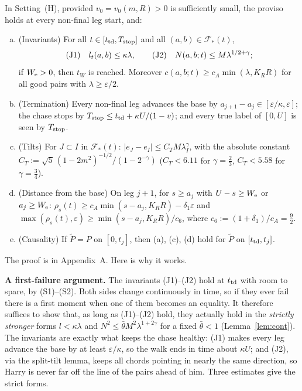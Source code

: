 \begin{theorem}\label{thm:end}
In Setting~\textup{(H)}, provided $v_0=v_0(m,R)>0$ is sufficiently small, the proviso holds at every non-final leg
start, and:
\begin{enumerate}[(a)]
\setlength{\itemsep}{1pt}\setlength{\parskip}{0pt}
\item \textup{(Invariants)} For all $t\in[t_{\mathrm{td}},T_{\mathrm{stop}}]$ and all $(a,b)\in\mathcal F_*(t)$,
\begin{equation}\label{eq:invariants}
\text{\textup{(J1)}}\quad l_t(a,b)\le\kappa\lambda,\qquad\text{\textup{(J2)}}\quad N(a,b;t)\le M\lambda^{1/2+\gamma};
\end{equation}
if $W_{\mathrm{e}}>0$, then $t_W$ is reached. Moreover $c(a,b;t)\ge c_A\min(\lambda,K_RR)$ for all good pairs with
$\lambda\ge\varepsilon/2$.
\item \textup{(Termination)} Every non-final leg advances the base by $a_{j+1}-a_j\in[\varepsilon/\kappa,\varepsilon]$;
the chase stops by $T_{\mathrm{stop}}\le t_{\mathrm{td}}+\kappa U/(1-v)$; and every true label of $[0,U]$ is seen by $T_{\mathrm{stop}}$.
\item \textup{(Tilts)} For $J\subset I$ in $\mathcal F_*(t)$: $|e_J-e_I|\le C_TM\lambda_I^\gamma$, with the absolute
constant $C_T:=\sqrt5\,(1-2m^2)^{-1/2}/(1-2^{-\gamma})$ \textup($C_T<6.11$ for $\gamma=\frac23$, $C_T<5.58$ for
$\gamma=\frac34$\textup).
\item \textup{(Distance from the base)} On leg $j+1$, for $s\ge a_j$ with $U-s\ge W_{\mathrm{e}}$ or $a_j\ge W_{\mathrm{e}}$:
$\rho_s(t)\ge c_A\min(s-a_j,K_RR)-\delta_1\varepsilon$ and $\max(\rho_s(t),\varepsilon)\ge\min(s-a_j,K_RR)/c_6$, where
$c_6:=(1+\delta_1)/c_A=\frac92$.
\item \textup{(Causality)} If $\tilde P=P$ on $[0,t_j]$, then \textup{(a)}, \textup{(c)}, \textup{(d)} hold for
$\tilde P$ on $[t_{\mathrm{td}},t_j]$.
\end{enumerate}
\end{theorem}

The proof is in Appendix~A. Here is why it works.

\textbf{A first-failure argument.} The invariants (J1)--(J2) hold at $t_{\mathrm{td}}$ with room to spare, by (S1)--(S2). Both
sides change continuously in time, so if they ever fail there is a first moment when one of them becomes an equality.
It therefore suffices to show that, as long as (J1)--(J2) hold, they actually hold in the \emph{strictly stronger} forms
$l<\kappa\lambda$ and $N^2\le\bar\theta M^2\lambda^{1+2\gamma}$ for a fixed $\bar\theta<1$ (Lemma~\ref{lem:cont}). The
invariants are exactly what keeps the chase healthy: (J1) makes every leg advance the base by at least $\varepsilon/\kappa$,
so the walk ends in time about $\kappa U$; and (J2), via the split-tilt lemma, keeps all chords pointing in nearly the
same direction, so Harry is never far off the line of the pairs ahead of him. Three estimates give the strict forms.


